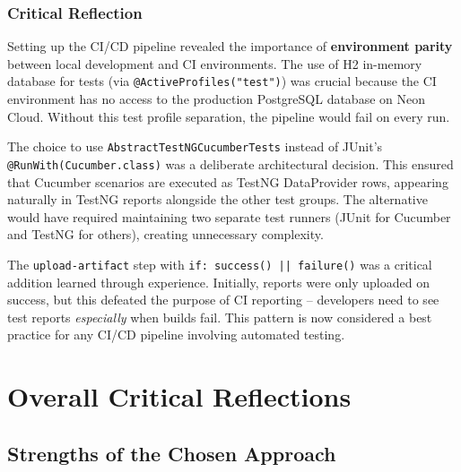 \documentclass[12pt,a4paper]{article}
\begin{document}
\subsubsection{Critical Reflection}

Setting up the CI/CD pipeline revealed the importance of \textbf{environment parity} between local development and CI environments. The use of H2 in-memory database for tests (via \texttt{@ActiveProfiles("test")}) was crucial because the CI environment has no access to the production PostgreSQL database on Neon Cloud. Without this test profile separation, the pipeline would fail on every run.

The choice to use \texttt{AbstractTestNGCucumberTests} instead of JUnit's \texttt{@RunWith(Cucumber.class)} was a deliberate architectural decision. This ensured that Cucumber scenarios are executed as TestNG DataProvider rows, appearing naturally in TestNG reports alongside the other test groups. The alternative would have required maintaining two separate test runners (JUnit for Cucumber and TestNG for others), creating unnecessary complexity.

The \texttt{upload-artifact} step with \texttt{if: success() || failure()} was a critical addition learned through experience. Initially, reports were only uploaded on success, but this defeated the purpose of CI reporting -- developers need to see test reports \textit{especially} when builds fail. This pattern is now considered a best practice for any CI/CD pipeline involving automated testing.

\section{Overall Critical Reflections}

\subsection{Strengths of the Chosen Approach}
\end{document}
